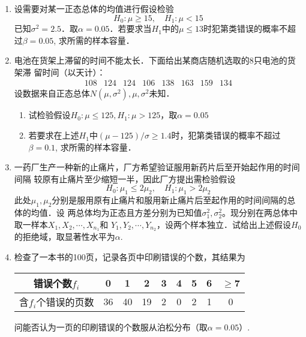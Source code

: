 \documentclass[10pt,a4paper]{article}
\begin{document}
\begin{enumerate}
    \item 设需要对某一正态总体的均值进行假设检验
    $$H_0:\mu \geq 15,\quad H_1:\mu <15$$
    已知$\sigma^2=2.5$．取$\alpha=0.05$．若要求当$H_1$中的$\mu\leq 13$时犯第\uppercase\expandafter{}类错误的概率不超过$\beta=0.05$,
    求所需的样本容量．




    \item 电池在货架上滞留的时间不能太长．下面给出某商店随机选取的8只电池的货架滞
    留时间（以天计）：
    $$\begin{array}{cccccccc}
        108 & 124 & 124 & 106 & 138 & 163 & 159 & 134
    \end{array}$$
    设数据来自正态总体$N(\mu,\sigma^2),\mu,\sigma^2$未知．
    \begin{enumerate}
        \item 试检验假设$H_0:\mu \leq 125,H_1:\mu >125$，取$\alpha=0.05$
        \item 若要求在上述$H_1$中$(\mu-125)/\sigma\geq 1.4$时，犯第\uppercase\expandafter{}类错误的概率不超过$\beta=0.1$,
        求所需的样本容量．
    \end{enumerate}




    \item 一药厂生产一种新的止痛片，厂方希望验证服用新药片后至开始起作用的时间间隔
    较原有止痛片至少缩短一半，因此厂方提出需检验假设
    $$H_0:\mu_1\leq 2\mu_2,\quad H_1:\mu_1>2\mu_2$$
    此处$\mu_1,\mu_2$分别是服用原有止痛片和服用新止痛片后至起作用的时间间隔的总体的均值．设
    两总体均为正态且方差分别为已知值$\sigma_1^2,\sigma_2^2$。现分别在两总体中取一样本$X_1,X_2,\cdots,X_{n_1}$和
    $Y_1,Y_2,\cdots,Y_{n_2}$，设两个样本独立．试给出上述假设$H_0$的拒绝域，取显著性水平为$\alpha$.




    \item 检查了一本书的100页，记录各页中印刷错误的个数，其结果为
    \renewcommand{\arraystretch}{1.3} 
    \begin{table}[H]\centering
        \begin{tabular}{c|cccccccc}
        错误个数$f_i$    & 0  & 1  & 2  & 3 & 4 & 5 & 6 & $\geq$7 \\ \hline
        含$f_i$个错误的页数 & 36 & 40 & 19 & 2 & 0 & 2 & 1 & 0      
        \end{tabular}
    \end{table}
    \renewcommand{\arraystretch}{1.0} 
    问能否认为一页的印刷错误的个数服从泊松分布（取$\alpha=0.05$）.






\end{enumerate}
\end{document}
